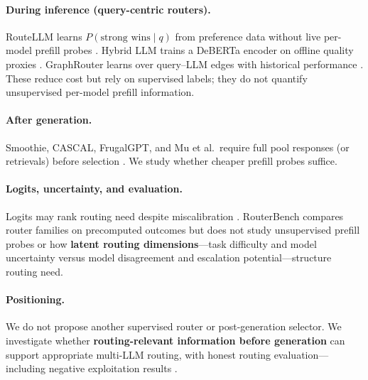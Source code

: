 \paragraph{During inference (query-centric routers).}
RouteLLM learns $P(\text{strong wins} \mid q)$ from preference data without live per-model prefill probes \citep{ong2024routellm}.
Hybrid LLM trains a DeBERTa encoder on offline quality proxies \citep{ding2024hybrid}.
GraphRouter learns over query--LLM edges with historical performance \citep{feng2025graphrouter}.
These reduce cost but rely on supervised labels; they do not quantify unsupervised per-model prefill information.

\paragraph{After generation.}
Smoothie, CASCAL, FrugalGPT, and Mu et al.\ require full pool responses (or retrievals) before selection \citep{guha2024smoothie,niu2026cascal,chen2023frugalgpt,mu2025ragrouting}.
We study whether cheaper prefill probes suffice.

\paragraph{Logits, uncertainty, and evaluation.}
Logits may rank routing need despite miscalibration \citep{he2023uncertainty,plaut2024chat,kadavath2022language}.
RouterBench compares router families on precomputed outcomes \citep{hu2024routerbench} but does not study unsupervised prefill probes or how \textbf{latent routing dimensions}---task difficulty and model uncertainty versus model disagreement and escalation potential---structure routing need.

\paragraph{Positioning.}
We do not propose another supervised router or post-generation selector.
We investigate whether \textbf{routing-relevant information before generation} can support appropriate multi-LLM routing, with honest routing evaluation---including negative exploitation results \citep{plaut2024chat,hu2024routerbench}.
